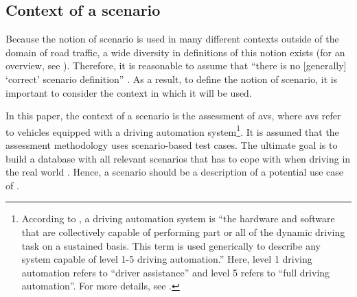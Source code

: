 \subsection{Context of a scenario}
\label{sec:context}

Because the notion of scenario is used in many different contexts \cstartd outside of the domain of road traffic\cendd, a wide diversity in definitions of this notion exists (for an overview, see \autocite{vannotten2003updated, bishop2007scentechniques}). Therefore, it is reasonable to assume that ``there is no [generally] `correct' scenario definition'' \autocite{vannotten2003updated}. As a result, to define the notion of scenario, it is important to consider the context in which it will be used. 

In this paper, the context of a scenario is the assessment of \acp{av}, where \acp{av} refer to vehicles equipped with a driving automation system\footnote{According to \autocite{sae2018j3016}, a driving automation system is ``the hardware and software that are collectively capable of performing part or all of the dynamic driving task on a sustained basis. This term is used generically to describe any system capable of level 1-5 driving automation.'' Here, level 1 driving automation refers to ``driver assistance'' and level 5 refers to ``full driving automation''. For more details, see \autocite{sae2018j3016}.}. 
It is assumed that the assessment methodology uses scenario-based test cases. %
The ultimate goal is to build a database with all relevant scenarios that  has to cope with when driving in the real world \autocite{putz2017pegasus}. Hence, a scenario should be a description of a potential use case of . 




